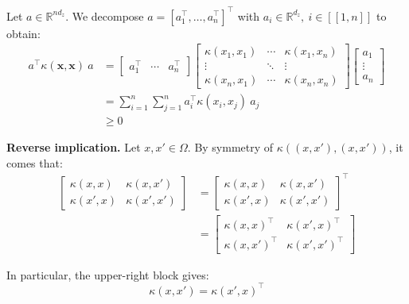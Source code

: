 Let $a\in\mathbb{R}^{nd_z}$. We decompose $a=[a_1^\top,\dots,a_n^\top]^\top$ with $a_i\in\mathbb{R}^{d_z},\:i\in[\![1,n]\!]$ to obtain:
\begin{equation}
	\begin{aligned}
	a^\top \kappa(\mathbf{x},\mathbf{x})\:a&=\begin{bmatrix}a_1^\top&\cdots&a_n^\top\end{bmatrix}\begin{bmatrix}\kappa(x_1,x_1)&\cdots&\kappa(x_1,x_n)\\\vdots&\ddots&\vdots\\\kappa(x_n,x_1)&\cdots&\kappa(x_n,x_n)\end{bmatrix}\begin{bmatrix}a_1\\\vdots\\a_n\end{bmatrix}\\
	&=\sum_{i=1}^n\sum_{j=1}^na_i^\top \kappa(x_i,x_j)\:a_j\\
	&\geq0
	\end{aligned}
\end{equation}

\textbf{Reverse implication.} Let $x,x'\in\Omega$. By symmetry of $\kappa((x,x'),(x,x'))$, it comes that:
\begin{equation}
	\begin{aligned}
	\begin{bmatrix}
	\kappa(x,x)&\kappa(x,x')\\\kappa(x',x)&\kappa(x',x')
	\end{bmatrix}&=\begin{bmatrix}
	\kappa(x,x)&\kappa(x,x')\\\kappa(x',x)&\kappa(x',x')
	\end{bmatrix}^\top\\
	&=\begin{bmatrix}
	\kappa(x,x)^\top&\kappa(x',x)^\top\\\kappa(x,x')^\top&\kappa(x',x')^\top
	\end{bmatrix}
	\end{aligned}
\end{equation}

In particular, the upper-right block gives:
\begin{equation}
	\kappa(x,x')=\kappa(x',x)^\top
\end{equation}

